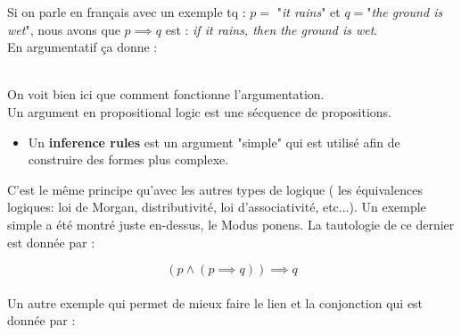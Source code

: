 \hspace{0.4cm}

\begin{deduction}
\end{deduction}

\hspace{0.4cm}

Si on parle en français avec un exemple tq : $p = $ "\textit{it rains}" et $q = $"\textit{the ground is wet}", nous avons que $p \implies q$ est : \textit{if it rains, then the ground is wet}. 
\\ En argumentatif ça donne :

\hspace{0.4cm}

\begin{deduction}
\end{deduction}

\hspace{0.4cm}
\\

On voit bien ici que comment fonctionne l'argumentation. 
\\
Un argument en propositional logic est une sécquence de propositions.
\begin{itemize}
    \item Un \textbf{inference rules} est un argument "simple" qui est utilisé afin de construire des formes plus complexe.
\end{itemize}

C'est le même principe qu'avec les autres types de logique ( les équivalences logiques: loi de Morgan, distributivité, loi d'associativité, etc...). Un exemple simple a été montré juste en-dessus, le Modus ponens. La tautologie de ce dernier est donnée par :

\begin{equation*}
    (p\wedge(p\implies q)) \implies q
\end{equation*}
\\
Un autre exemple qui permet de mieux faire le lien et la conjonction qui est donnée par : 

\begin{deduction}
\end{deduction}
\\
\hspace{0.4cm}

